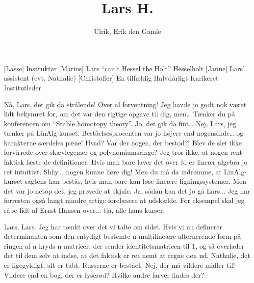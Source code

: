 \documentclass[a4paper,11pt]{article}
\title{Lars H.}
\author{Ulrik, Erik den Gamle}
\begin{document}
\maketitle

\begin{roles}
[Lasse] Instruktør
[Marius] Lars “can’t Hessel the Holt” Hesselholt
[Janne] Lars’ assistent (evt. Nathalie)
[Christoffer] En tilfældig Halvdårligt Karikeret Institutleder

\end{roles}

\begin{props}
\end{props}


\begin{sketch}


  Nå, Lars, det gik da strålende!
Over al forventning! Jeg havde jo godt nok været lidt bekymret for, om det var den rigtige opgave til dig, men…
 Tænker du på konferencen om “Stable homotopy theory”. Jo, det gik da fint…
 Nej, Lars, jeg tænker på LinAlg-kurset. Beståelsesprocenten var jo højere end nogensinde… og karakterne særdeles pæne!
 Hvad? Var der nogen, der bestod?! Blev de slet ikke forvirrede over skævlegemer og polynomiumsringe?
 Jeg tror ikke, at nogen rent faktisk læste de definitioner. Hvis man bare
laver det over $\mathbb{R}$, er lineær algebra jo ret intuitivt.
 Shhy... nogen kunne høre dig!
 Men du må da indrømme, at LinAlg-kurset sagtens kan bestås, hvis man bare kan løse lineære ligningssystemer.
 Men det var jo netop det, jeg prøvede at skjule.
 Ja, sådan kan det jo gå Lars...  Jeg har forresten også langt mindre artige forelæsere at udskælde.
For eksempel skal jeg råbe lidt af Ernst Hansen over... tja, alle hans kurser.



 Lars, Lars. Jeg har tænkt over det vi talte om sidst. Hvis vi nu definerer
determinanten som den entydigt bestemte n-multilineære alternerende form på ringen af
n kryds n-matricer, der sender identitetsmatricen til 1, og så overlader det til
dem selv at indse, at det faktisk er ret nemt at regne den ud.
 Nathalie, det er ligegyldigt, alt er tabt. Russerne er bestået.
 
 Nej, der må vildere midler til! 
 Vildere end en bog, der er lyserød? Hvilke andre farver findes der?


\end{sketch}
\end{document}
